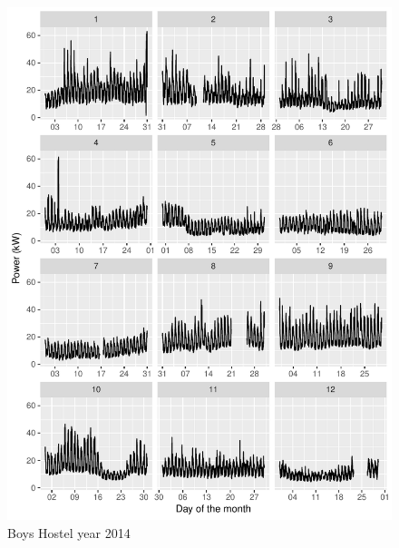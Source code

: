 \documentclass[11pt, oneside]{article}   	%
\begin{document}
\begin{figure}
\includegraphics[keepaspectratio]{boys_hostel_year2014.pdf}
\caption{Boys Hostel year 2014}
\end{figure}
\end{document}
